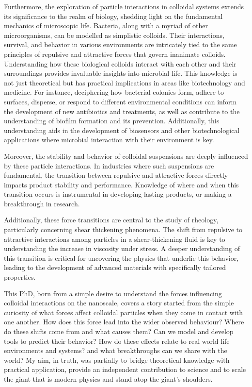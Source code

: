 Furthermore, the exploration of particle interactions in colloidal systems extends its significance to the realm of biology, shedding light on the fundamental mechanics of microscopic life. Bacteria, along with a myriad of other microorganisms, can be modelled as simplistic colloids. Their interactions, survival, and behavior in various environments are intricately tied to the same principles of repulsive and attractive forces that govern inanimate colloids. Understanding how these biological colloids interact with each other and their surroundings provides invaluable insights into microbial life. This knowledge is not just theoretical but has practical implications in areas like biotechnology and medicine. For instance, deciphering how bacterial colonies form, adhere to surfaces, disperse, or respond to different environmental conditions can inform the development of new antibiotics and treatments, as well as contribute to the understanding of biofilm formation and its prevention. Additionally, this understanding aids in the development of biosensors and other biotechnological applications where microbial interaction with their environment is key. 

Moreover, the stability and behavior of colloidal suspensions are deeply influenced by these particle interactions. In industries where such suspensions are fundamental, the transition between repulsive and attractive forces directly impacts product stability and performance. Knowledge of where and when this transition occurs is instrumental in developing lasting products, or making a breakthrough in research.

Additionally, these force transitions are central to the study of rheology, particularly concerning shear thickening phenomena. The shift from repulsive to attractive interactions among particles in a shear-thickening fluid is key to understanding the increase in viscosity under stress. A deeper understanding of this transition is critical for uncovering the physics that underlie this behavior, leading to the development of advanced materials with specifically tailored properties.

This PhD, born from a simple desire to understand the forces influencing colloidal interactions on the nanoscale, covers a story started from the simple curiosity of what forces affect colloidal particles when they come in contact with one another. How does this force lead into the wider observed behaviour? Where do these shifts come from and what causes them? Can we model and develop tools to predict their behavior? How do these effects relate to real world life environments and systems? and what breakthroughs can we share with the world? My aim, in truth, was partially to bridge theoretical knowledge with practical application, provide an independent contribution to science and to scale the giant that is modern physics and stand atop the giant's shoulders.

